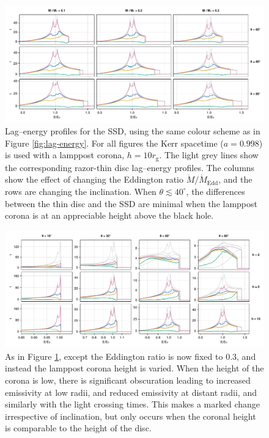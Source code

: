 \documentclass[fleqn,usenatbib]{mnras}
\newcommand{\rg}{r_\text{g}}
\begin{document}
\begin{figure}
    \centering
    \includegraphics[width=0.99\linewidth]{figures/reverberation.thick-disc.pdf}
    \caption{Lag--energy profiles for the SSD, using the same colour scheme as in
        Figure \ref{fig:lag-energy}. For all figures the Kerr spacetime
        ($a=0.998$) is used with a lamppost corona, $h = 10 \rg$. The light grey
        lines show the corresponding razor-thin disc lag--energy profiles. The
        columns show the effect of changing the Eddington ratio $\dot{M} /
        \dot{M}_\text{Edd}$, and the rows are changing the inclination. When
        $\theta \lesssim 40^\circ$, the differences between the thin disc and
        the SSD are minimal when the lamppost corona is at an appreciable height
        above the black hole.}
    \label{fig:reverb-thick-discs}
\end{figure}

\begin{figure}
    \centering
    \includegraphics[width=0.99\linewidth]{figures/reverberation.thick-disc-corona.pdf}
    \caption{As in Figure \ref{fig:reverb-thick-discs}, except the Eddington
        ratio is now fixed to $0.3$, and instead the lamppost corona height is
        varied. When the height of the corona is low, there is significant
        obscuration leading to increased emissivity at low radii, and reduced
        emissivity at distant radii, and similarly with the light crossing
    times. This makes a marked change irrespective of inclination, but only
occurs when the coronal height is comparable to the height of the disc.}
    \label{fig:reverb-thick-discs-corona}
\end{figure}
\end{document}

